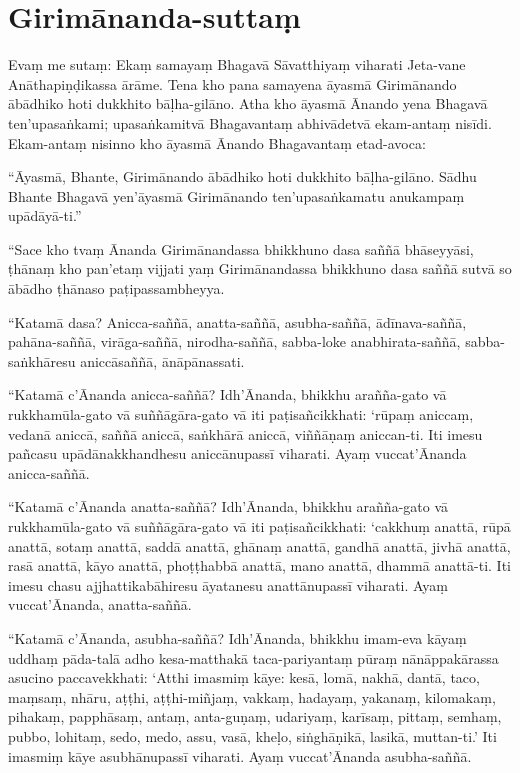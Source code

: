 \section{Girimānanda-suttaṃ}

Evaṃ me sutaṃ: Ekaṃ samayaṃ Bhagavā Sāvatthiyaṃ viharati Jeta-vane
Anāthapiṇḍikassa ārāme. Tena kho pana samayena āyasmā Girimānando ābādhiko hoti
dukkhito bāḷha-gilāno. Atha kho āyasmā Ānando yena Bhagavā ten’upasaṅkami;
upasaṅkamitvā Bhagavantaṃ abhivādetvā ekam-antaṃ nisīdi. Ekam-antaṃ nisinno kho
āyasmā Ānando Bhagavantaṃ etad-avoca:

“Āyasmā, Bhante, Girimānando ābādhiko hoti dukkhito bāḷha-gilāno. Sādhu Bhante
Bhagavā yen’āyasmā Girimānando ten’upasaṅkamatu anukampaṃ upādāyā-ti.”

“Sace kho tvaṃ Ānanda Girimānandassa bhikkhuno dasa saññā bhāseyyāsi, ṭhānaṃ kho
pan’etaṃ vijjati yaṃ Girimānandassa bhikkhuno dasa saññā sutvā so ābādho ṭhānaso
paṭipassambheyya.

“Katamā dasa? Anicca-saññā, anatta-saññā, asubha-saññā, ādīnava-saññā,
pahāna-saññā, virāga-saññā, nirodha-saññā, sabba-loke anabhirata-saññā,
sabba-saṅkhāresu aniccāsaññā, ānāpānassati.

“Katamā c’Ānanda anicca-saññā? Idh’Ānanda, bhikkhu arañña-gato vā
rukkhamūla-gato vā suññāgāra-gato vā iti paṭisañcikkhati: ‘rūpaṃ aniccaṃ, vedanā
aniccā, saññā aniccā, saṅkhārā aniccā, viññāṇaṃ aniccan-ti. Iti imesu pañcasu
upādānakkhandhesu aniccānupassī viharati. Ayaṃ vuccat’Ānanda anicca-saññā.

“Katamā c’Ānanda anatta-saññā? Idh’Ānanda, bhikkhu arañña-gato vā
rukkhamūla-gato vā suññāgāra-gato vā iti paṭisañcikkhati: ‘cakkhuṃ anattā, rūpā
anattā, sotaṃ anattā, saddā anattā, ghānaṃ anattā, gandhā anattā, jivhā anattā,
rasā anattā, kāyo anattā, phoṭṭhabbā anattā, mano anattā, dhammā anattā-ti. Iti
imesu chasu ajjhattikabāhiresu āyatanesu anattānupassī viharati. Ayaṃ
vuccat’Ānanda, anatta-saññā.

“Katamā c’Ānanda, asubha-saññā? Idh’Ānanda, bhikkhu imam-eva kāyaṃ uddhaṃ
pāda-talā adho kesa-matthakā taca-pariyantaṃ pūraṃ nānāppakārassa asucino
paccavekkhati: ‘Atthi imasmiṃ kāye: kesā, lomā, nakhā, dantā, taco, maṃsaṃ,
nhāru, aṭṭhi, aṭṭhi-miñjaṃ, vakkaṃ, hadayaṃ, yakanaṃ, kilomakaṃ, pihakaṃ,
papphāsaṃ, antaṃ, anta-guṇaṃ, udariyaṃ, karīsaṃ, pittaṃ, semhaṃ, pubbo, lohitaṃ,
sedo, medo, assu, vasā, kheḷo, siṅghāṇikā, lasikā, muttan-ti.’ Iti imasmiṃ kāye
asubhānupassī viharati. Ayaṃ vuccat’Ānanda asubha-saññā.

